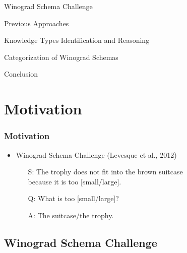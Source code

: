 \documentclass[c,8pt,xcolor...,x11names]{beamer}
\begin{document}
 
\begin{frame}
\customtitle
\begin{list2}
\item Winograd Schema Challenge
\item Previous Approaches
\item Knowledge Types Identification and Reasoning
\item Categorization of Winograd Schemas
\item Conclusion
\end{list2}
\end{frame}


\section{Motivation} 


\begin{frame}
  \frametitle{Motivation}
	\begin{itemize} 	
	\item Winograd Schema Challenge (Levesque et al., 2012)
	\begin{itemize}
		\normalsize
		\item[S:] The trophy does not fit into the brown suitcase\\ because \alert{it} is too \alert{[small/large]}.
		\item[Q:] What is too [small/large]?
		\item[A:] The suitcase/the trophy.
	\end{itemize}	
	
\end{itemize}
		\centering

\end{frame}

\begin{comment}
	content...

\begin{frame}
\vfill
\begin{LARGE}
\hfill Structure of a {\sc Beamer} Document \hfill 
\end{LARGE}
\vfill
\end{frame}
\end{comment}

\subsection{Winograd Schema Challenge}
\end{document}
